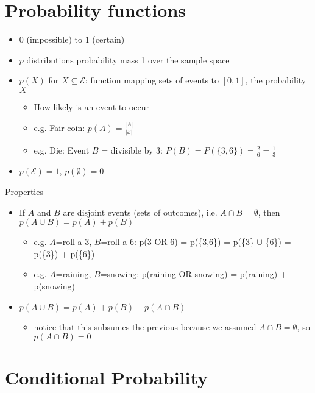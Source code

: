 \documentclass[11pt,letterpaper]{article}
\begin{document}
\section{Probability functions}

\begin{itemize}
  \item 0 (impossible) to 1 (certain)
  \item $p$ distributions probability mass 1 over the sample space
  \item $p(X)$ for $X \subseteq \mathcal{E}$: function mapping sets of events to $[0,1]$, the probability $X$
  \begin{itemize}
    \item How likely is an event to occur
    \item e.g. Fair coin: $p(A) = \frac{|A|}{|\mathcal{E}|}$
    \item e.g. Die: Event $B$ = divisible by 3: $P(B) = P(\{3,6\}) = \frac{2}{6} = \frac{1}{3}$
  \end{itemize}
  \item $p(\mathcal{E}) = 1$, $p(\emptyset) = 0$
\end{itemize}

Properties

\begin{itemize}
  \item If $A$ and $B$ are disjoint events (sets of outcomes), i.e. $A \cap B = \emptyset$, then $p(A \cup B) = p(A) + p(B)$
  \begin{itemize}
    \item e.g. $A$=roll a 3, $B$=roll a 6: p(3 OR 6) = p(\{3,6\}) = p(\{3\} $\cup$ \{6\}) = p(\{3\}) + p(\{6\}) 
    \item e.g. $A$=raining, $B$=snowing: p(raining OR snowing) = p(raining) + p(snowing)
  \end{itemize}
  \item $p(A \cup B) = p(A) + p(B) - p(A \cap B)$
  \begin{itemize}
    \item notice that this subsumes the previous because we assumed $A \cap B = \emptyset$, so $p(A \cap B) = 0$
  \end{itemize}
\end{itemize}


\section{Conditional Probability}
\end{document}
